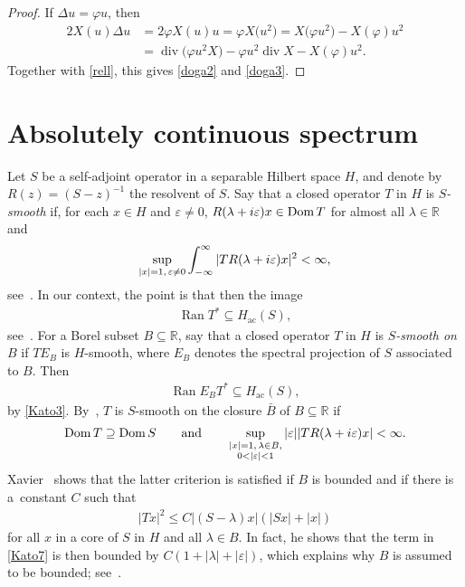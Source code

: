\documentclass[11pt]{article}
\numberwithin{equation}{section}
\numberwithin{equation}{section}
\DeclareMathOperator{\diver}{div}
\DeclareMathOperator{\dom}{Dom}
\DeclareMathOperator{\ran}{Ran}
\def\ac{\mathrm{ac}}
\def\R{\mathbb R}
\def\ve{\varepsilon}
\begin{document}
\begin{proof}
If $\Delta u=\varphi u$, then
\begin{align*}
 2X(u)\Delta u &= 2\varphi X(u)u = \varphi X\bigl(u^2\bigr) = X\bigl(\varphi u^2\bigr) - X(\varphi)u^2 \\
 &= \diver\bigl(\varphi u^2X\bigr) - \varphi u^2\diver X - X(\varphi)u^2.
\end{align*}
Together with \eqref{rell}, this gives \eqref{doga2} and \eqref{doga3}.
\end{proof}

\setcounter{section}{3}
\section{Absolutely continuous spectrum}%

Let $S$ be a self-adjoint operator in a separable Hilbert space $H$,
and denote by $R(z)=(S-z)^{-1}$ the resolvent of $S$.
Say that a closed operator $T$ in $H$ is \emph{$S$-smooth} if, for each $x\in H$ and $\ve\ne0$,
$R(\lambda+{\rm i}\ve)x\in\dom T$
 for almost all $\lambda\in\R$ and
\begin{align*}%
 \sup_{|x|=1,\,\ve\ne0} \int_{-\infty}^\infty |TR(\lambda+{\rm i}\ve)x|^2 < \infty,
\end{align*}
see~\cite[p.~142]{ReedSimon78}.
In our context, the point is that then the image
\begin{align}\label{Kato3}
 \ran T^* \subseteq H_{\ac}(S),
\end{align}
see~\cite[Theorem XIII.23]{ReedSimon78}.
For a Borel subset $B\subseteq\R$,
say that a closed operator $T$ in $H$ is \emph{$S$-smooth on $B$} if $TE_B$ is $H$-smooth,
where $E_B$ denotes the spectral projection of $S$ associated to $B$.
Then
\begin{align*}%
 \ran E_BT^* \subseteq H_{\ac}(S),
\end{align*}
by \eqref{Kato3}.
By~\cite[Theorem XIII.30]{ReedSimon78}, $T$ is $S$-smooth on the closure $\bar B$ of $B\subseteq\R$ if
\begin{align}\label{Kato7}
 \dom T\supseteq\dom S
 \qquad\text{and}\qquad
 \sup_{\substack{|x|=1, \, \lambda\in B,\\ 0<|\ve|<1}} |\ve||TR(\lambda+{\rm i}\ve)x| < \infty.
\end{align}
Xavier~\cite[p.~581f.]{Xavier1988} shows that the latter criterion is satisfied
if $B$ is bounded and if there is a~constant $C$ such that
\begin{align}\label{Kato9}
 |Tx|^2 \le C|(S-\lambda)x|(|Sx|+|x|)
\end{align}
for all $x$ in a core of $S$ in $H$ and all $\lambda\in B$.
In fact, he shows that the term in \eqref{Kato7} is then bounded by $C(1+|\lambda|+|\ve|)$,
which explains why $B$ is assumed to be bounded; see~\cite[top of~p.~582]{Xavier1988}.
\end{document}
